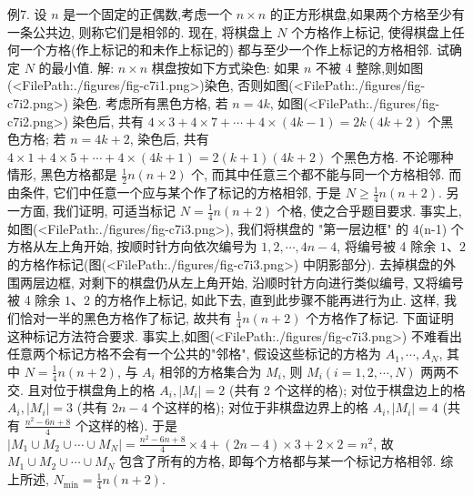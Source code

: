 例7. 设 $n$ 是一个固定的正偶数,考虑一个 $n \times n$ 的正方形棋盘,如果两个方格至少有一条公共边, 则称它们是相邻的.
现在, 将棋盘上 $N$ 个方格作上标记, 使得棋盘上任何一个方格(作上标记的和未作上标记的) 都与至少一个作上标记的方格相邻.
试确定 $N$ 的最小值.
解: $n \times n$ 棋盘按如下方式染色: 如果 $n$ 不被 4 整除,则如图(<FilePath:./figures/fig-c7i1.png>)染色,
否则如图(<FilePath:./figures/fig-c7i2.png>) 染色.
考虑所有黑色方格, 若 $n=4 k$, 如图(<FilePath:./figures/fig-c7i2.png>) 染色后, 共有 $4 \times 3+4 \times 7+\cdots+4 \times(4 k-1)=2 k(4 k+2)$ 个黑色方格; 若 $n=4 k+2$, 染色后, 共有 $4 \times 1+4 \times 5+\cdots+4 \times(4 k+1)=2(k+1)(4 k+2)$ 个黑色方格.
不论哪种情形, 黑色方格都是 $\frac{1}{2} n(n+2)$ 个, 而其中任意三个都不能与同一个方格相邻.
而由条件, 它们中任意一个应与某个作了标记的方格相邻, 于是 $N \geqslant \frac{1}{4} n(n+2)$.
另一方面, 我们证明, 可适当标记 $N=\frac{1}{4} n(n+2)$ 个格, 使之合乎题目要求.
事实上, 如图(<FilePath:./figures/fig-c7i3.png>), 我们将棋盘的 "第一层边框" 的 4(n-1) 个方格从左上角开始, 按顺时针方向依次编号为 $1,2, \cdots, 4 n-4$, 将编号被 4 除余 $1 、 2$ 的方格作标记(图(<FilePath:./figures/fig-c7i3.png>) 中阴影部分).
去掉棋盘的外围两层边框, 对剩下的棋盘仍从左上角开始, 沿顺时针方向进行类似编号, 又将编号被 4 除余 $1 、 2$ 的方格作上标记, 如此下去, 直到此步骤不能再进行为止.
这样, 我们恰对一半的黑色方格作了标记, 故共有 $\frac{1}{4} n(n+2)$ 个方格作了标记.
下面证明这种标记方法符合要求.
事实上,如图(<FilePath:./figures/fig-c7i3.png>) 不难看出任意两个标记方格不会有一个公共的"邻格", 假设这些标记的方格为 $A_1, \cdots, A_N$, 其中 $N=\frac{1}{4} n(n+2)$, 与 $A_i$ 相邻的方格集合为 $M_i$, 则 $M_i(i=1,2, \cdots, N)$ 两两不交.
且对位于棋盘角上的格 $A_i,\left|M_i\right|=2$ (共有 2 个这样的格); 对位于棋盘边上的格 $A_i,\left|M_i\right|=3$ (共有 $2 n-4$ 个这样的格); 对位于非棋盘边界上的格 $A_i,\left|M_i\right|=4$ (共有 $\frac{n^2-6 n+8}{4}$ 个这样的格). 于是 $\left|M_1 \cup M_2 \cup \cdots \cup M_N\right|=\frac{n^2-6 n+8}{4} \times4+(2 n-4) \times 3+2 \times 2=n^2$, 故 $M_1 \cup M_2 \cup \cdots \cup M_N$ 包含了所有的方格, 即每个方格都与某一个标记方格相邻.
综上所述, $N_{\min }=\frac{1}{4} n(n+2)$.



